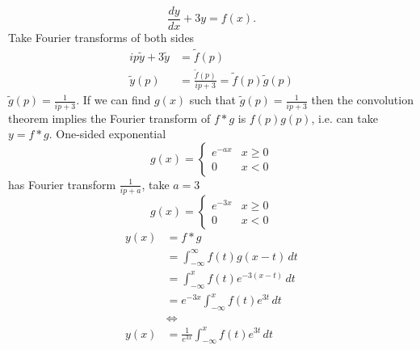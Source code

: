 \documentclass[10pt, a4paper]{article}
\begin{document}
\begin{example}
    \[
    \frac{dy}{dx} + 3y = f(x).
    \]
    Take Fourier transforms of both sides
    \begin{align*}
        ip\tilde{y} + 3\tilde{y} &= \tilde{f}(p) \\
        \tilde{y}(p) &= \frac{\tilde{f}(p)}{ip + 3} = \tilde{f}(p)\tilde{g}(p)
    \end{align*}
    $\tilde{g}(p) = \frac{1}{ip + 3}$.
    If we can find $g(x)$ such that $\tilde{g}(p) = \frac{1}{ip + 3}$ then the convolution theorem implies the Fourier transform of $f * g$ is $f(p)g(p)$,
    i.e. can take $y = f * g$.
    One-sided exponential
    \[
    g(x) = \begin{cases}
        e ^ {-ax} & x \geq 0 \\
        0 & x < 0
    \end{cases}
    \]
    has Fourier transform $\frac{1}{ip + a}$,
    take $a = 3$
    \[
    g(x) = \begin{cases}
        e ^ {-3x} & x \geq 0 \\
        0 & x < 0
    \end{cases}
    \]
    \begin{align*}
        y(x) &= f * g \\
        &= \int_{-\infty}^{\infty}f(t)g(x - t)\,dt \\
        &= \int_{-\infty}^{x}f(t)e ^ {-3(x - t)}\,dt \\
        &= e ^ {-3x}\int_{-\infty}^{x}f(t)e ^ {3t}\,dt \\
        &\iff \\
        y(x) &= \frac{1}{e ^ {3x}}\int_{-\infty}^{x}f(t)e ^ {3t}\,dt
    \end{align*}
\end{example}
\end{document}

